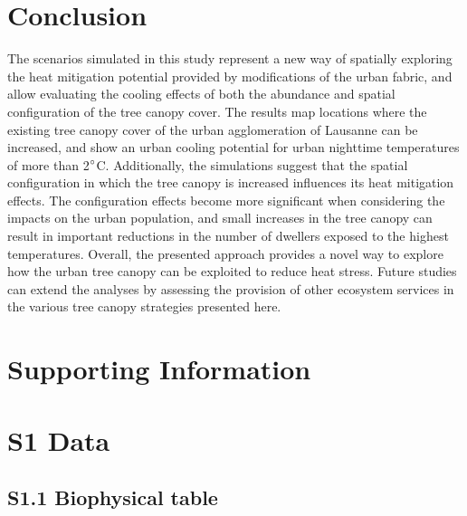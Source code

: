 \documentclass[10pt,letterpaper]{article}
\begin{document}
\section*{Conclusion}
The scenarios simulated in this study represent a new way of spatially exploring the heat mitigation potential provided by modifications of the urban fabric, and allow evaluating the cooling effects of both the abundance and spatial configuration of the tree canopy cover.
The results map locations where the existing tree canopy cover of the urban agglomeration of Lausanne can be increased, and show an urban cooling potential for urban nighttime temperatures of more than 2$\degree$C.
Additionally, the simulations suggest that the spatial configuration in which the tree canopy is increased influences its heat mitigation effects.
The configuration effects become more significant when considering the impacts on the urban population, and small increases in the tree canopy can result in important reductions in the number of dwellers exposed to the highest temperatures.
Overall, the presented approach provides a novel way to explore how the urban tree canopy can be exploited to reduce heat stress.
Future studies can extend the analyses by assessing the provision of other ecosystem services in the various tree canopy strategies presented here.


\section*{Supporting Information}

\setcounter{figure}{0}
\renewcommand{\thefigure}{S\arabic{figure}}
\setcounter{table}{0}
\renewcommand{\thetable}{S\arabic{table}}

\section*{S1 Data}

\subsection*{S1.1 Biophysical table}
\label{sec:si-biophysical-table}
\end{document}
